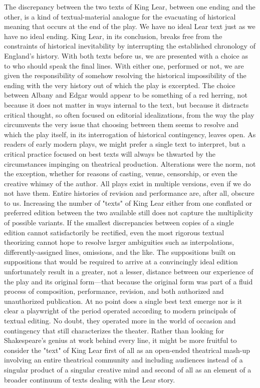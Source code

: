 	The discrepancy between the two texts of King Lear, between one ending and the other, is a kind of textual-material analogue for the evacuating of historical meaning that occurs at the end of the play. We have no ideal Lear text just as we have no ideal ending. King Lear, in its conclusion, breaks free from the constraints of historical inevitability by interrupting the established chronology of England's history. With both texts before us, we are presented with a choice as to who should speak the final lines. With either one, performed or not, we are given the responsibility of somehow resolving the historical impossibility of the ending with the very history out of which the play is excerpted. The choice between Albany and Edgar would appear to be something of a red herring, not because it does not matter in ways internal to the text, but because it distracts critical thought, so often focused on editorial idealizations, from the way the play circumvents the very issue that choosing between them seems to resolve and which the play itself, in its interrogation of historical contingency, leaves open. As readers of early modern plays, we might prefer a single text to interpret, but a critical practice focused on best texts will always be thwarted by the circumstances impinging on theatrical production. Alterations were the norm, not the exception, whether for reasons of casting, venue, censorship, or even the creative whimsy of the author. All plays exist in multiple versions, even if we do not have them. Entire histories of revision and performance are, after all, obscure to us. Increasing the number of "texts" of King Lear either from one conflated or preferred edition between the two available still does not capture the multiplicity of possible variants. If the smallest discrepancies between copies of a single edition cannot satisfactorily be rectified, even the most rigorous textual theorizing cannot hope to resolve larger ambiguities such as interpolations, differently-assigned lines, omissions, and the like. The suppositions built on suppositions that would be required to arrive at a convincingly ideal edition unfortunately result in a greater, not a lesser, distance between our experience of the play and its original form—that because the original form was part of a fluid process of composition, performance, revision, and both authorized and unauthorized publication. At no point does a single best text emerge nor is it clear a playwright of the period operated according to modern principals of textual editing. No doubt, they operated more in the world of occasion and contingency that still characterizes the theater. Rather than looking for Shakespeare's genius at work behind every line, it might be more fruitful to consider the "text" of King Lear first of all as an open-ended theatrical mash-up involving an entire theatrical community and including audiences instead of a singular product of a singular creative mind and second of all as an element of a broader continuum of texts dealing with the Lear story.
